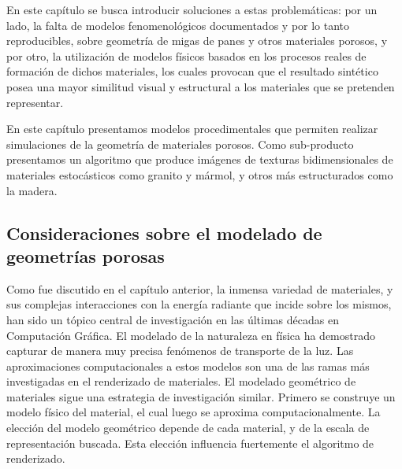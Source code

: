 En este capítulo se busca introducir soluciones a estas problemáticas: por un lado, la falta de modelos fenomenológicos documentados y por lo tanto reproducibles, sobre geometría de migas de panes y otros materiales porosos, y por otro, la utilización de modelos físicos basados en los procesos reales de formación de dichos materiales, los cuales provocan que el resultado sintético posea una mayor similitud visual y estructural a los materiales que se pretenden representar.

En este capítulo presentamos modelos procedimentales que permiten realizar simulaciones de la geometría de materiales porosos.
Como sub-producto presentamos un algoritmo que produce imágenes de texturas bidimensionales de materiales estocásticos como granito y mármol, y otros más estructurados como la madera.

\subsection{Consideraciones sobre el modelado de geometrías porosas}
Como fue discutido en el capítulo anterior, la inmensa variedad de materiales, y sus complejas interacciones con la energía radiante que incide sobre los mismos, han sido un tópico central de investigación en las últimas décadas en Computación Gráfica.
El modelado de la naturaleza en física ha demostrado capturar de manera muy precisa fenómenos de transporte de la luz.
Las aproximaciones computacionales a estos modelos son una de las ramas más investigadas en el renderizado de materiales.
El modelado geométrico de materiales sigue una estrategia de investigación similar. Primero se construye un modelo físico del material, el cual luego se aproxima computacionalmente.
La elección del modelo geométrico depende de cada material, y de la escala de representación buscada.
Esta elección influencia fuertemente el algoritmo de renderizado. 


